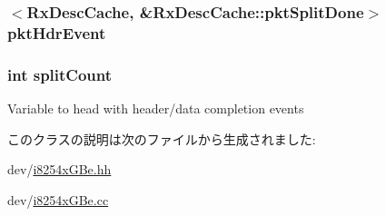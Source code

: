 \label{classIGbE_1_1RxDescCache_a28964c300d774b0dc1d7cabcff1cdc7b}
\hypertarget{classIGbE_1_1RxDescCache_aa1e4265fed174c3f3f46281e329a45de}{
\subsubsection[{pktHdrEvent}]{$<${\bf RxDescCache}, \&RxDescCache::pktSplitDone$>$ {\bf pktHdrEvent}}}
\label{classIGbE_1_1RxDescCache_aa1e4265fed174c3f3f46281e329a45de}
\hypertarget{classIGbE_1_1RxDescCache_acdf18a76e0bed7bae532a2708fc559da}{
\subsubsection[{splitCount}]{\setlength{\rightskip}{0pt plus 5cm}int {\bf splitCount}}}
\label{classIGbE_1_1RxDescCache_acdf18a76e0bed7bae532a2708fc559da}
Variable to head with header/data completion events 

このクラスの説明は次のファイルから生成されました:\begin{DoxyCompactItemize}
\item 
dev/\hyperlink{i8254xGBe_8hh}{i8254xGBe.hh}\item 
dev/\hyperlink{i8254xGBe_8cc}{i8254xGBe.cc}\end{DoxyCompactItemize}
